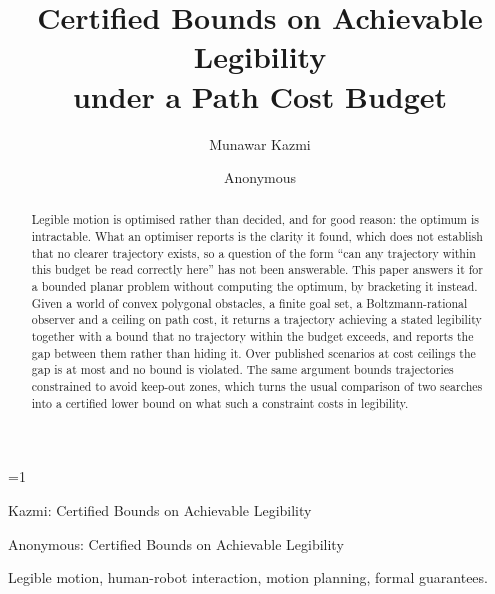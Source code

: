 \documentclass[journal]{IEEEtran}
\begin{document}
\title{Certified Bounds on Achievable Legibility \\ under a Path Cost Budget}

%
%
\providecommand{\isnamed}{0}
\ifnum\isnamed=1
  \author{Munawar Kazmi}
  {Kazmi: Certified Bounds on Achievable Legibility}
\else
  \author{Anonymous}
  {Anonymous: Certified Bounds on Achievable Legibility}
\fi

\maketitle

\begin{abstract}
Legible motion is optimised rather than decided, and for good reason: the
optimum is intractable. What an optimiser reports is the clarity it found,
which does not establish that no clearer trajectory exists, so a question of
the form ``can any trajectory within this budget be read correctly here'' has
not been answerable. This paper answers it for a bounded planar problem without
computing the optimum, by bracketing it instead. Given a world of convex polygonal
obstacles, a finite goal set, a Boltzmann-rational observer and a ceiling on
path cost, it returns a trajectory achieving a stated legibility together with
a bound that no trajectory within the budget exceeds, and reports the gap
between them rather than hiding it. Over \suiteWorlds{} published scenarios at
\suiteCeilings{} cost ceilings the gap is at most \suiteWorstGap{} and no
bound is violated. The same argument bounds trajectories constrained to avoid
keep-out zones, which turns the usual comparison of two searches into a
certified lower bound on what such a constraint costs in legibility.
\end{abstract}

\begin{IEEEkeywords}
Legible motion, human-robot interaction, motion planning, formal guarantees.
\end{IEEEkeywords}
\end{document}
